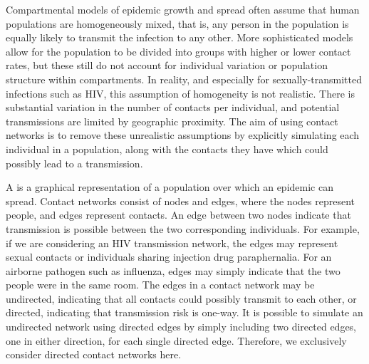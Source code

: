 Compartmental models of epidemic growth and spread often assume that human
populations are homogeneously mixed, that is, any person in the population is
equally likely to transmit the infection to any other. More sophisticated
models allow for the population to be divided into groups with higher or lower
contact rates, but these still do not account for individual variation or
population structure within compartments. In reality, and especially for
sexually-transmitted infections such as HIV, this assumption of homogeneity is
not realistic. There is substantial variation in the number of contacts per
individual, and potential transmissions are limited by geographic proximity.
The aim of using contact networks is to remove these unrealistic assumptions by 
explicitly simulating each individual in a population, along with the contacts
they have which could possibly lead to a transmission.

A  is a graphical representation of a population over
which an epidemic can spread. Contact networks consist of nodes and edges,
where the nodes represent people, and edges represent contacts. An edge between
two nodes indicate that transmission is possible between the two corresponding
individuals. For example, if we are considering an HIV transmission network,
the edges may represent sexual contacts or individuals sharing injection drug
paraphernalia. For an airborne pathogen such as influenza, edges may simply
indicate that the two people were in the same room. The edges in a contact
network may be undirected, indicating that all contacts could possibly transmit
to each other, or directed, indicating that transmission risk is one-way. It is
possible to simulate an undirected network using directed edges by simply
including two directed edges, one in either direction, for each single directed
edge. Therefore, we exclusively consider directed contact networks here.
